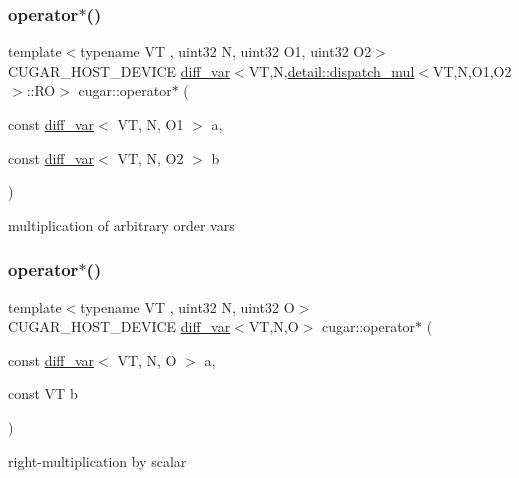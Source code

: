 \subsubsection{\texorpdfstring{operator$\ast$()}{operator*()}\hspace{0.1cm}{\footnotesize\ttfamily [1/3]}}
{\footnotesize\ttfamily template$<$typename VT , uint32 N, uint32 O1, uint32 O2$>$ \\
C\+U\+G\+A\+R\+\_\+\+H\+O\+S\+T\+\_\+\+D\+E\+V\+I\+CE \hyperlink{structcugar_1_1diff__var}{diff\+\_\+var}$<$VT,N,\hyperlink{structcugar_1_1detail_1_1dispatch__mul}{detail\+::dispatch\+\_\+mul}$<$VT,N,O1,O2$>$\+::RO$>$ cugar\+::operator$\ast$ (\begin{DoxyParamCaption}\item[{const \hyperlink{structcugar_1_1diff__var}{diff\+\_\+var}$<$ VT, N, O1 $>$}]{a,  }\item[{const \hyperlink{structcugar_1_1diff__var}{diff\+\_\+var}$<$ VT, N, O2 $>$}]{b }\end{DoxyParamCaption})\hspace{0.3cm}{\ttfamily [inline]}}

multiplication of arbitrary order vars \mbox{\label{group___auto_diff_module_ga4e23b0400e7f6f9335b35f739dcc8452}} 
\subsubsection{\texorpdfstring{operator$\ast$()}{operator*()}\hspace{0.1cm}{\footnotesize\ttfamily [2/3]}}
{\footnotesize\ttfamily template$<$typename VT , uint32 N, uint32 O$>$ \\
C\+U\+G\+A\+R\+\_\+\+H\+O\+S\+T\+\_\+\+D\+E\+V\+I\+CE \hyperlink{structcugar_1_1diff__var}{diff\+\_\+var}$<$VT,N,O$>$ cugar\+::operator$\ast$ (\begin{DoxyParamCaption}\item[{const \hyperlink{structcugar_1_1diff__var}{diff\+\_\+var}$<$ VT, N, O $>$}]{a,  }\item[{const VT}]{b }\end{DoxyParamCaption})\hspace{0.3cm}{\ttfamily [inline]}}

right-\/multiplication by scalar \mbox{\label{group___auto_diff_module_gab78c0e159eab94313c80fd6c78b5a0fd}} 
